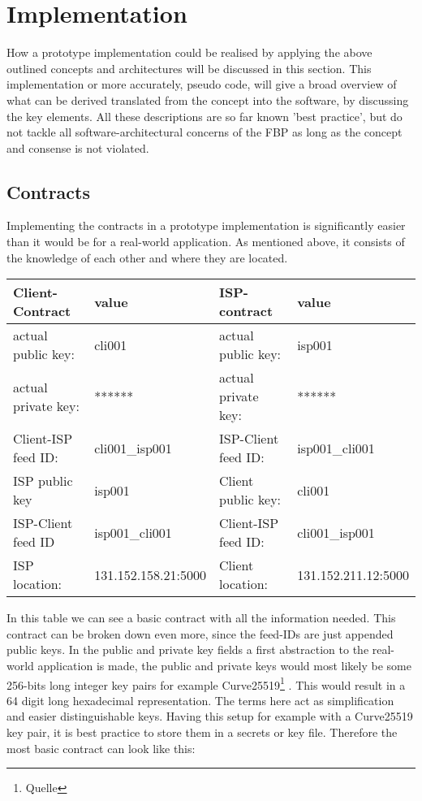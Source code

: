 \chapter{Implementation}
How a prototype implementation could be realised by applying the above outlined concepts and architectures will be discussed in this section. This implementation or more accurately, pseudo code, will give a broad overview of what can be derived translated from the concept into the software, by discussing the key elements. All these descriptions are so far known 'best practice', but do not tackle all software-architectural concerns of the FBP as long as the concept and consense is not violated.
\section{Contracts}
Implementing the contracts in a prototype implementation is significantly easier than it would be for a real-world application. As mentioned above, it consists of the knowledge of each other and where they are located.
\begin{center}
    \begin{tabular}{llll} \toprule
        Client-Contract&value&ISP-contract&value\\ \midrule
        actual public key:& cli001 &  actual public key: &isp001  \\ 
        actual private key:& ****** & actual private key:& ****** \\
        Client-ISP feed ID:& cli001\_isp001 &ISP-Client feed ID:&isp001\_cli001 \\ 
        ISP public key&isp001&Client public key:&cli001\\
        ISP-Client feed ID&isp001\_cli001&Client-ISP feed ID:&cli001\_isp001\\
        ISP location:&131.152.158.21:5000 &Client location:& 131.152.211.12:5000 \\\bottomrule
    \end{tabular}
\end{center}

In this table we can see a basic contract with all the information needed. This contract can be broken down even more, since the feed-IDs are just appended public keys. In the public and private key fields a first abstraction to the real-world application is made, the public and private keys would most likely be some 256-bits long integer key pairs for example Curve25519\footnote{Quelle} . This would result in a 64 digit long hexadecimal representation. The terms here act as simplification and easier distinguishable keys. Having this setup for example with a Curve25519 key pair, it is best practice to store them in a secrets or key file. Therefore the most basic contract can look like this:

